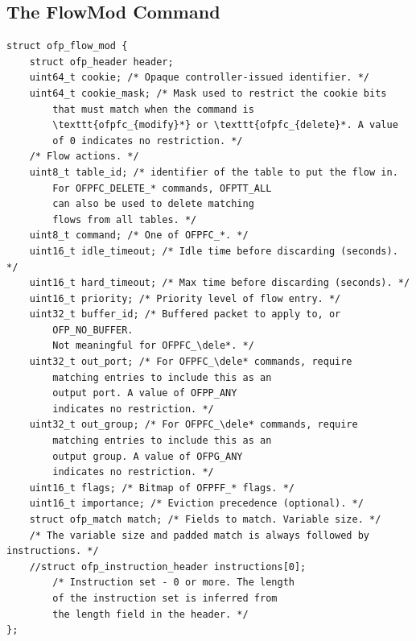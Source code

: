 \documentclass[conference]{sigcomm-alternate}
\newcommand{\dele}{\textbf{delete}\xspace}
\begin{document}
{

}

\clearpage

\onecolumn

\begin{appendix}

\section{The FlowMod Command}

\begin{lstlisting}
struct ofp_flow_mod {
	struct ofp_header header;
	uint64_t cookie; /* Opaque controller-issued identifier. */
	uint64_t cookie_mask; /* Mask used to restrict the cookie bits
		that must match when the command is
		\texttt{ofpfc_{modify}*} or \texttt{ofpfc_{delete}*. A value
		of 0 indicates no restriction. */
	/* Flow actions. */
	uint8_t table_id; /* identifier of the table to put the flow in.
		For OFPFC_DELETE_* commands, OFPTT_ALL
		can also be used to delete matching
		flows from all tables. */
	uint8_t command; /* One of OFPFC_*. */
	uint16_t idle_timeout; /* Idle time before discarding (seconds). */
	uint16_t hard_timeout; /* Max time before discarding (seconds). */
	uint16_t priority; /* Priority level of flow entry. */
	uint32_t buffer_id; /* Buffered packet to apply to, or
		OFP_NO_BUFFER.
		Not meaningful for OFPFC_\dele*. */
	uint32_t out_port; /* For OFPFC_\dele* commands, require
		matching entries to include this as an
		output port. A value of OFPP_ANY
		indicates no restriction. */
	uint32_t out_group; /* For OFPFC_\dele* commands, require
		matching entries to include this as an
		output group. A value of OFPG_ANY
		indicates no restriction. */
	uint16_t flags; /* Bitmap of OFPFF_* flags. */
	uint16_t importance; /* Eviction precedence (optional). */
	struct ofp_match match; /* Fields to match. Variable size. */
	/* The variable size and padded match is always followed by instructions. */
	//struct ofp_instruction_header instructions[0];
		/* Instruction set - 0 or more. The length
		of the instruction set is inferred from
		the length field in the header. */
};
\end{lstlisting}



\end{appendix}
\end{document}
